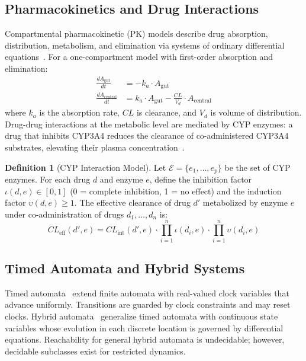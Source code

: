 \documentclass{article}
\theoremstyle{definition}
\newtheorem{definition}[theorem]{Definition}
\begin{document}
\subsection{Pharmacokinetics and Drug Interactions}

Compartmental pharmacokinetic (PK) models describe drug absorption, distribution, metabolism, and elimination via systems of ordinary differential equations~\cite{rowland2011clinical}. For a one-compartment model with first-order absorption and elimination:
\begin{align}
\frac{dA_{\text{gut}}}{dt} &= -k_a \cdot A_{\text{gut}} \label{eq:pk1}\\
\frac{dA_{\text{central}}}{dt} &= k_a \cdot A_{\text{gut}} - \frac{CL}{V_d} \cdot A_{\text{central}} \label{eq:pk2}
\end{align}
where $k_a$ is the absorption rate, $CL$ is clearance, and $V_d$ is volume of distribution. Drug-drug interactions at the metabolic level are mediated by CYP enzymes: a drug that inhibits CYP3A4 reduces the clearance of co-administered CYP3A4 substrates, elevating their plasma concentration~\cite{flockhart_cyp}.

\begin{definition}[CYP Interaction Model]
\label{def:cyp}
Let $\mathcal{E} = \{e_1, \ldots, e_p\}$ be the set of CYP enzymes. For each drug $d$ and enzyme $e$, define the inhibition factor $\iota(d,e) \in [0,1]$ (0 = complete inhibition, 1 = no effect) and the induction factor $\upsilon(d,e) \geq 1$. The effective clearance of drug $d'$ metabolized by enzyme $e$ under co-administration of drugs $d_1,\ldots,d_n$ is:
\[
CL_{\text{eff}}(d', e) = CL_{\text{int}}(d', e) \cdot \prod_{i=1}^{n} \iota(d_i, e) \cdot \prod_{i=1}^{n} \upsilon(d_i, e)
\]
\end{definition}

\subsection{Timed Automata and Hybrid Systems}

Timed automata~\cite{alur1994theory} extend finite automata with real-valued clock variables that advance uniformly. Transitions are guarded by clock constraints and may reset clocks. Hybrid automata~\cite{henzinger1996theory} generalize timed automata with continuous state variables whose evolution in each discrete location is governed by differential equations. Reachability for general hybrid automata is undecidable; however, decidable subclasses exist for restricted dynamics.
\end{document}
